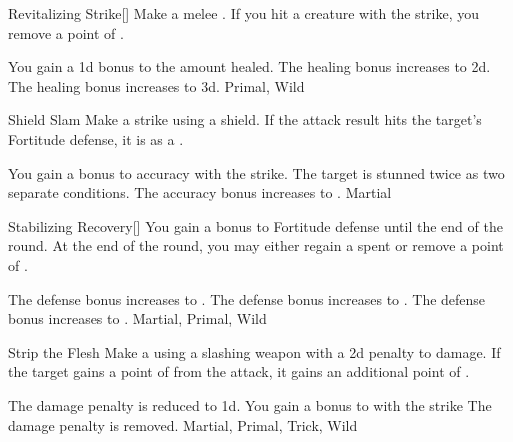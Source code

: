 \lowercase{\hypertarget{maneuver:Revitalizing Strike}{}}\label{maneuver:Revitalizing Strike}
\hypertarget{maneuver:Revitalizing Strike}{}
\begin{apability}{Revitalizing Strike}[]
Make a melee .
If you hit a creature with the strike, you remove a point of .

\rankline
{} You gain a \plus1d bonus to the amount healed.
 The healing bonus increases to \plus2d.
 The healing bonus increases to \plus3d.
 Primal, Wild
\end{apability}
\vspace{0.25em}



\lowercase{\hypertarget{maneuver:Shield Slam}{}}\label{maneuver:Shield Slam}
\hypertarget{maneuver:Shield Slam}{}
\begin{apability}{Shield Slam}
Make a strike using a shield.
If the attack result hits the target's Fortitude defense,
it is  as a .

\rankline
{} You gain a  bonus to accuracy with the strike.
 The target is stunned twice as two separate conditions.
 The accuracy bonus increases to .
 Martial
\end{apability}
\vspace{0.25em}



\lowercase{\hypertarget{maneuver:Stabilizing Recovery}{}}\label{maneuver:Stabilizing Recovery}
\hypertarget{maneuver:Stabilizing Recovery}{}
\begin{freeability}{Stabilizing Recovery}[]
You gain a  bonus to Fortitude defense until the end of the round.
At the end of the round, you may either regain a spent  or remove a point of .

\rankline
{} The defense bonus increases to .
 The defense bonus increases to .
 The defense bonus increases to .
 Martial, Primal, Wild
\end{freeability}
\vspace{0.25em}



\lowercase{\hypertarget{maneuver:Strip the Flesh}{}}\label{maneuver:Strip the Flesh}
\hypertarget{maneuver:Strip the Flesh}{}
\begin{apability}{Strip the Flesh}
Make a  using a slashing weapon with a \minus2d penalty to damage.
If the target gains a point of  from the attack, it gains an additional point of .

\rankline
{} The damage penalty is reduced to \minus1d.
 You gain a  bonus to  with the strike
 The damage penalty is removed.
 Martial, Primal, Trick, Wild
\end{apability}
\vspace{0.25em}



